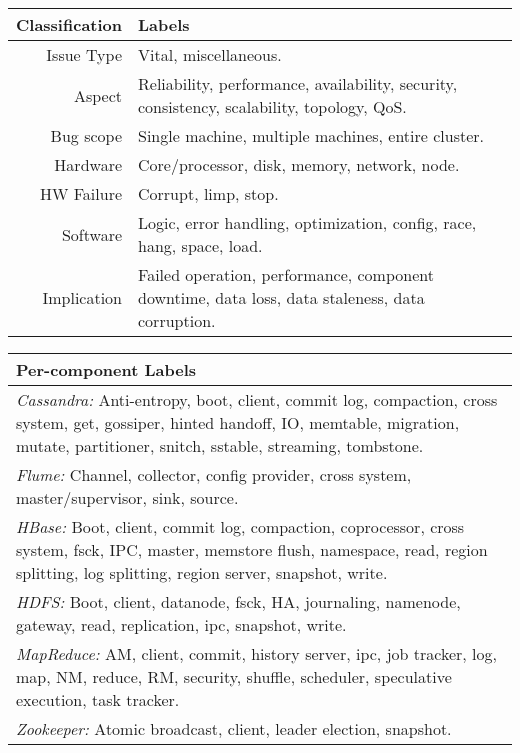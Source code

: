 
\begin{table}[!hbt]
\begin{center}
\begin{tabular}{r|p{5in}}
\hline
{\bf Classification} & {\bf Labels} \\
\hline
Issue Type & Vital, miscellaneous. \\
\hline
Aspect & Reliability, performance, availability, security, consistency,  scalability, topology, QoS. \\
\hline
Bug scope & Single machine, multiple machines, entire cluster. \\
\hline
Hardware & Core/processor, disk, memory, network, node. \\
\hline
HW Failure & Corrupt, limp, stop. \\
\hline
Software & Logic, error handling, optimization, config, race, hang, space, load. \\
\hline
Implication & Failed operation, performance, component downtime, data loss, data staleness, data corruption. \\
\hline
\end{tabular}


%
\begin{tabular}{p{3in}}
\\
\hline
{\bf Per-component Labels} \\
\hline
{\em Cassandra:} Anti-entropy, boot, client, commit log, compaction, cross system, get, gossiper, hinted handoff, IO, memtable, migration, mutate, partitioner, snitch, sstable, streaming, tombstone. \\
\hline
{\em Flume:} Channel, collector, config provider, cross system, master/supervisor, sink, source. \\
\hline
{\em HBase:} Boot, client, commit log, compaction, coprocessor, cross system, fsck, IPC, master, memstore flush, namespace, read, region splitting, log splitting, region server, snapshot, write. \\
\hline
{\em HDFS:} Boot, client, datanode, fsck, HA, journaling, namenode, gateway, read, replication, ipc, snapshot, write. \\
\hline
{\em MapReduce:} AM, client, commit, history server, ipc, job tracker, log, map, NM, reduce, RM, security, shuffle, scheduler, speculative execution, task tracker. \\
\hline
{\em Zookeeper:} Atomic broadcast, client, leader election, snapshot. \\
\hline
\end{tabular}
\fi
\end{center}
\vminfive
{}
\end{table}
